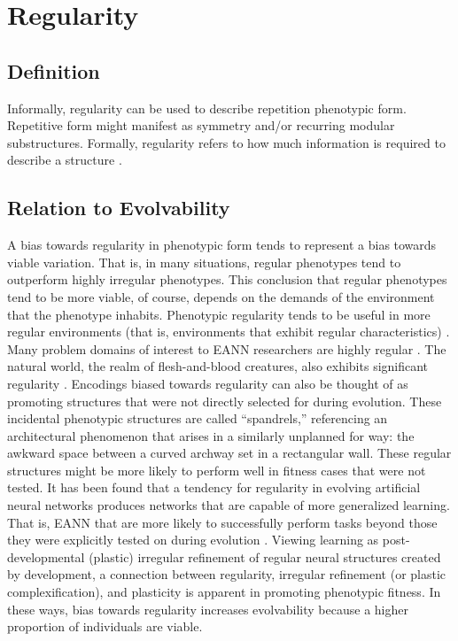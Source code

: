 \section{Regularity} \label{sec:regularity}
\subsection{Definition}
Informally, regularity can be used to describe repetition phenotypic form. Repetitive form might manifest as symmetry and/or recurring  modular substructures. Formally, regularity refers to how much information is required to describe a structure \cite{Clune2011OnRegularity}.

\subsection{Relation to Evolvability}
A bias towards regularity in phenotypic form tends to represent a bias towards viable variation.\mindmapmark{\usefulvariationregularity} That is, in many situations, regular phenotypes tend to outperform highly irregular phenotypes. This conclusion that regular phenotypes tend to be more viable, of course, depends on the demands of the environment that the phenotype inhabits. Phenotypic regularity tends to be useful in more regular environments (that is, environments that exhibit regular characteristics) \cite{Clune2011OnRegularity}. Many problem domains of interest to EANN researchers are highly regular \cite{Clune2011OnRegularity}. The natural world, the realm of flesh-and-blood creatures, also exhibits significant regularity \cite[pg 161]{Downing2015IntelligenceSystems}. Encodings biased towards regularity can also be thought of as promoting structures that were not directly selected for during evolution. These incidental phenotypic structures are called ``spandrels,'' referencing an architectural phenomenon that arises in a similarly unplanned for way: the awkward space between a curved archway set in a rectangular wall. These regular structures might be more likely to perform well in fitness cases that were not tested. It has been found that a tendency for regularity in evolving artificial neural networks produces networks that are capable of more generalized learning. That is, EANN that are more likely to successfully perform tasks beyond those they were explicitly tested on during evolution \cite{Tonelli2013OnNetworks}. Viewing learning as post-developmental (plastic) irregular refinement of regular neural structures created by development, a connection between regularity, irregular refinement (or plastic complexification), and plasticity is apparent in promoting phenotypic fitness.\mindmapmark{\usefulvariationregularitycomplexificationplasticity}  In these ways, bias towards regularity increases evolvability because a higher proportion of individuals are viable.


